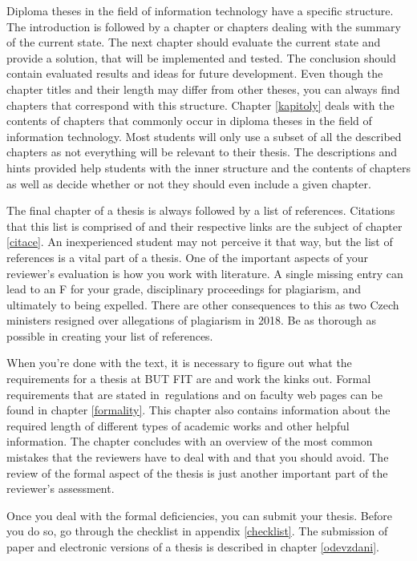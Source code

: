 Diploma theses in the field of information technology have a specific structure. The introduction is followed by a chapter or chapters dealing with the summary of the current state. The next chapter should evaluate the current state and provide a solution, that will be implemented and tested. The conclusion should contain evaluated results and ideas for future development. Even though the chapter titles and their length may differ from other theses, you can always find chapters that correspond with this structure. Chapter \ref{kapitoly} deals with the contents of chapters that commonly occur in diploma theses in the field of information technology. Most students will only use a subset of all the described chapters as not everything will be relevant to their thesis. The descriptions and hints provided help students with the inner structure and the contents of chapters as well as decide whether or not they should even include a given chapter. 

The final chapter of a thesis is always followed by a list of references. Citations that this list is comprised of and their respective links are the subject of chapter \ref{citace}. An inexperienced student may not perceive it that way, but the list of references is a vital part of a thesis. One of the important aspects of your reviewer's evaluation is how you work with literature. A single missing entry can lead to an F for your grade, disciplinary proceedings for plagiarism, and ultimately to being expelled. There are other consequences to this as two Czech ministers resigned over allegations of plagiarism in 2018. Be as thorough as possible in creating your list of references.

When you're done with the text, it is necessary to figure out what the requirements for a thesis at BUT FIT are and work the kinks out. Formal requirements that are stated in~regulations and on faculty web pages can be found in chapter \ref{formality}. This chapter also contains information about the required length of different types of academic works and other helpful information. The chapter concludes with an overview of the most common mistakes that the reviewers have to deal with and that you should avoid. The review of the formal aspect of the thesis is just another important part of the reviewer's assessment.

Once you deal with the formal deficiencies, you can submit your thesis. Before you do so, go through the checklist in appendix \ref{checklist}. The submission of paper and electronic versions of a thesis is described in chapter \ref{odevzdani}.


